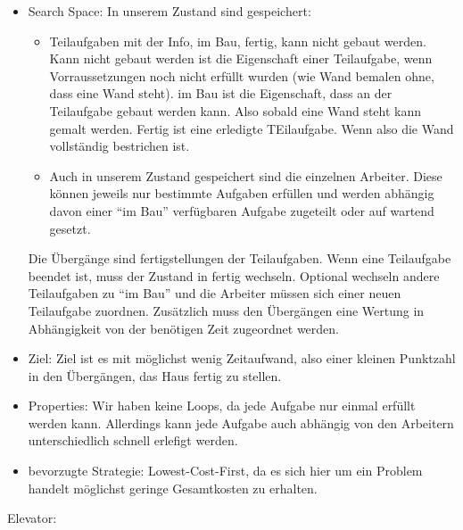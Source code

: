 \documentclass[ngerman]{fbi-aufgabenblatt}
\begin{document}
\begin{itemize}
    \item Search Space: In unserem Zustand sind gespeichert:
    
    \begin{itemize}
    
    \item Teilaufgaben mit der Info, im Bau, fertig, kann nicht gebaut werden. Kann nicht gebaut werden ist die Eigenschaft einer Teilaufgabe, wenn Vorraussetzungen noch nicht erfüllt wurden (wie Wand bemalen ohne, dass eine Wand steht). im Bau ist die Eigenschaft, dass an der Teilaufgabe gebaut werden kann. Also sobald eine Wand steht kann gemalt werden. Fertig ist eine erledigte TEilaufgabe. Wenn also die Wand vollständig bestrichen ist.
    
    \item Auch in unserem Zustand gespeichert sind die einzelnen Arbeiter. Diese können jeweils nur bestimmte Aufgaben erfüllen und werden abhängig davon einer “im Bau” verfügbaren Aufgabe zugeteilt oder auf wartend gesetzt.
    
    \end{itemize}
    
    Die Übergänge sind fertigstellungen der Teilaufgaben. Wenn eine Teilaufgabe beendet ist, muss der Zustand in fertig wechseln. Optional wechseln andere Teilaufgaben zu “im Bau” und die Arbeiter müssen sich einer neuen Teilaufgabe zuordnen. Zusätzlich muss den Übergängen eine Wertung in Abhängigkeit von der benötigen Zeit zugeordnet werden. 


    
    \item Ziel: Ziel ist es mit möglichst wenig Zeitaufwand, also einer kleinen Punktzahl in den Übergängen, das Haus fertig zu stellen. 

    \item Properties: Wir haben keine Loops, da jede Aufgabe nur einmal erfüllt werden kann. Allerdings kann jede Aufgabe auch abhängig von den Arbeitern unterschiedlich schnell erlefigt werden.

    \item bevorzugte Strategie: Lowest-Cost-First, da es sich hier um ein Problem handelt möglichst geringe Gesamtkosten zu erhalten.

\end{itemize}

Elevator:
\end{document}
